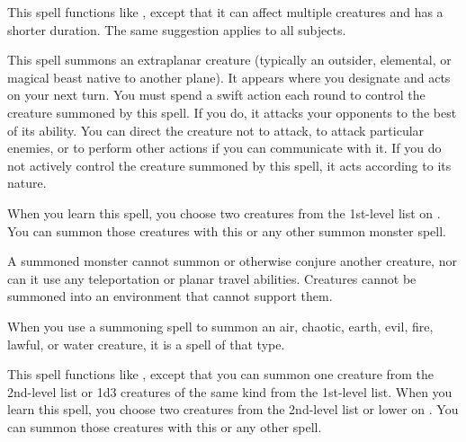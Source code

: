 \norepeatnotes

\spelldur{\durmed}
\spelleffect This spell functions like , except that it can affect multiple creatures and has a shorter duration. The same suggestion applies to all subjects.

\hypertarget{spell:summon monster}{}
\spelldur{\durshort \dismissable}
\spelleffect This spell summons an extraplanar creature (typically an outsider, elemental, or magical beast native to another plane). It appears where you designate and acts on your next turn. You must spend a swift action each round to control the creature summoned by this spell. If you do, it attacks your opponents to the best of its ability. You can direct the creature not to attack, to attack particular enemies, or to perform other actions if you can communicate with it. If you do not actively control the creature summoned by this spell, it acts according to its nature.
\par When you learn this spell, you choose two creatures from the 1st-level list on . You can summon those creatures with this or any other summon monster spell.
\par A summoned monster cannot summon or otherwise conjure another creature, nor can it use any teleportation or planar travel abilities. Creatures cannot be summoned into an environment that cannot support them.
\par When you use a summoning spell to summon an air, chaotic, earth, evil, fire, lawful, or water creature, it is a spell of that type.

\spelleffect This spell functions like , except that you can summon one creature from the 2nd-level list or 1d3 creatures of the same kind from the 1st-level list. When you learn this spell, you choose two creatures from the 2nd-level list or lower on . You can summon those creatures with this or any other  spell.

